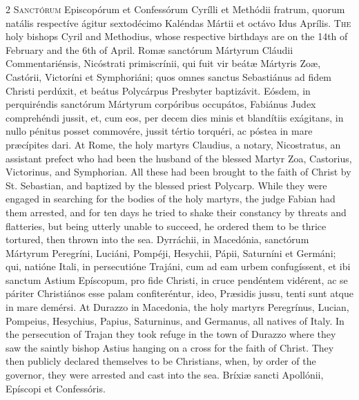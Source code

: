 \begin{paracol}{2}
\lettrine[lines=2]{S}{anctórum} Episcopórum 
 et Confessórum Cyrílli et Methódii fratrum, quorum natális respectíve ágitur 
 sextodécimo Kaléndas Mártii et octávo Idus Aprílis.
\switchcolumn
{}
\lettrine[lines=2]{T}{he} holy bishops Cyril and Methodius, 
 whose respective birthdays are on the 14th of February and the 6th of 
 April.
\switchcolumn*
{}
Romæ sanctórum Mártyrum 
 Cláudii Commentariénsis, Nicóstrati primiscrínii, qui fuit vir beátæ 
 Mártyris Zoæ, Castórii, Victoríni et Symphoriáni; quos omnes sanctus 
 Sebastiánus ad fidem Christi perdúxit, et beátus Polycárpus Presbyter 
 baptizávit. Eósdem, in perquiréndis sanctórum Mártyrum corpóribus 
 occupátos, Fabiánus Judex comprehéndi jussit, et, cum eos, per decem dies 
 minis et blandítiis exágitans, in nullo pénitus posset commovére, jussit 
 tértio torquéri, ac póstea in mare præcípites dari.
\switchcolumn
{}
At Rome, the holy martyrs Claudius, 
 a notary, Nicostratus, an assistant prefect who had been the husband of the 
 blessed Martyr Zoa, Castorius, Victorinus, and 
 Symphorian. All these had been brought to the faith of Christ by St. Sebastian, 
 and baptized by the blessed priest Polycarp. While they were engaged 
 in searching for the bodies of the holy martyrs, the judge Fabian had them 
 arrested, and for ten days he tried to shake their constancy by threats and 
 flatteries, but being utterly unable to succeed, he ordered them to be 
 thrice tortured, then thrown into the sea.
\switchcolumn*
{}
Dyrráchii, in 
 Macedónia, sanctórum Mártyrum Peregríni, Luciáni, Pompéji, Hesychii, Pápii, 
 Saturníni et Germáni; qui, natióne Itali, in persecutióne Trajáni, cum ad 
 eam urbem confugíssent, et ibi sanctum Astium Epíscopum, pro fide Christi, 
 in cruce pendéntem vidérent, ac se páriter Christiános esse palam 
 confiteréntur, ideo, Præsidis jussu, tenti sunt atque in mare demérsi.
\switchcolumn
{}
At Durazzo in Macedonia, the holy 
 martyrs Peregrínus, Lucian, Pompeius, Hesychius, Papius, Saturninus, and 
 Germanus, all natives of Italy. In the persecution of Trajan they took 
 refuge in the town of Durazzo where they saw the saintly bishop Astius 
 hanging on a cross for the faith of Christ. They then publicly 
 declared themselves to be Christians, when, by order of the governor, they 
 were arrested and cast into the sea.
\switchcolumn*
{}
Bríxiæ sancti Apollónii, 
 Epíscopi et Confessóris.

\end{paracol}
